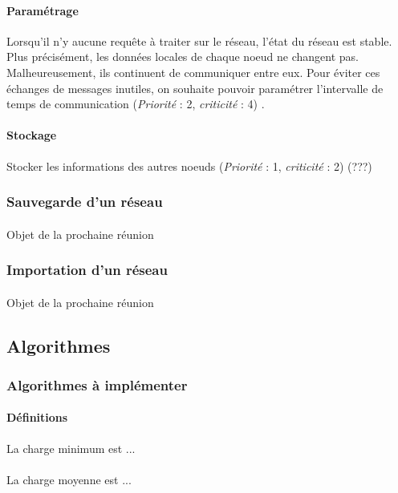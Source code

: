 \documentclass[12pt]{article}
\newcommand{\besoin}[2] {
  (\textit{Priorité} : #1, \textit{criticité} : #2)
}
\begin{document}
\paragraph{Paramétrage} Lorsqu'il n'y aucune requête à traiter sur le réseau, l'état du réseau est stable.
Plus précisément, les données locales de chaque noeud ne changent pas.
Malheureusement, ils continuent de communiquer entre eux.
Pour éviter ces échanges de messages inutiles, on souhaite pouvoir paramétrer l'intervalle de temps de communication \besoin{2}{4}.

\paragraph{Stockage} Stocker les informations des autres noeuds \besoin{1}{2}  (???)


\subsubsection{Sauvegarde d'un réseau}

\paragraph{}  Objet de la prochaine réunion


\subsubsection{Importation d'un réseau}

\paragraph{} Objet de la prochaine réunion


\subsection{Algorithmes}

\subsubsection{Algorithmes à implémenter}

\paragraph{Définitions} La charge minimum est ...

\paragraph{} La charge moyenne est ...
\end{document}
